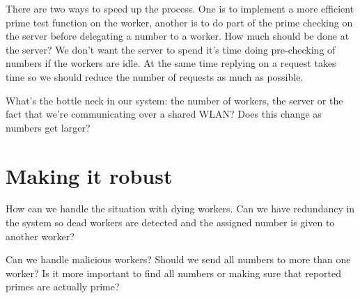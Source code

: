 \documentclass[a4paper,11pt]{article}
\begin{document}
There are two ways to speed up the process. One is to implement a more
efficient prime test function on the worker, another is to do part of
the prime checking on the server before delegating a number to a
worker. How much should be done at the server? We don't want the
server to spend it's time doing pre-checking of numbers if the workers
are idle. At the same time replying on a request takes time so we
should reduce the number of requests as much as possible.

What's the bottle neck in our system: the number of workers, the
server or the fact that we're communicating over a shared WLAN? Does
this change as numbers get larger?

\section{Making it robust}

How can we handle the situation with dying workers. Can we have
redundancy in the system so dead workers are detected and the assigned
number is given to another worker?

Can we handle malicious workers? Should we send all numbers to more
than one worker? Is it more important to find all numbers or making
sure that reported primes are actually prime?
\end{document}
